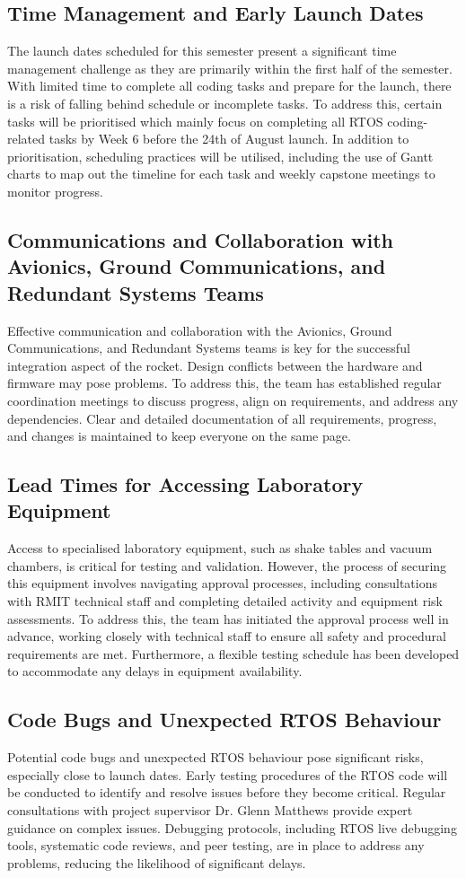 \subsection{Time Management and Early Launch Dates}
The launch dates scheduled for this semester present a significant time management challenge as they are primarily within the first half of the semester. With limited time to complete all coding tasks and prepare for the launch, there is a risk of falling behind schedule or incomplete tasks. To address this, certain tasks will be prioritised which mainly focus on completing all RTOS coding-related tasks by Week 6 before the 24th of August launch. In addition to prioritisation, scheduling practices will be utilised, including the use of Gantt charts to map out the timeline for each task and weekly capstone meetings to monitor progress. 

\subsection{Communications and Collaboration with Avionics, Ground Communications, and Redundant Systems Teams}
Effective communication and collaboration with the Avionics, Ground Communications, and Redundant Systems teams is key for the successful integration aspect of the rocket. Design conflicts between the hardware and firmware may pose problems. To address this, the team has established regular coordination meetings to discuss progress, align on requirements, and address any dependencies. Clear and detailed documentation of all requirements, progress, and changes is maintained to keep everyone on the same page. 

\subsection{Lead Times for Accessing Laboratory Equipment}
Access to specialised laboratory equipment, such as shake tables and vacuum chambers, is critical for testing and validation. However, the process of securing this equipment involves navigating approval processes, including consultations with RMIT technical staff and completing detailed activity and equipment risk assessments. To address this, the team has initiated the approval process well in advance, working closely with technical staff to ensure all safety and procedural requirements are met. Furthermore, a flexible testing schedule has been developed to accommodate any delays in equipment availability. 

\subsection{Code Bugs and Unexpected RTOS Behaviour}
Potential code bugs and unexpected RTOS behaviour pose significant risks, especially close to launch dates. Early testing procedures of the RTOS code will be conducted to identify and resolve issues before they become critical. Regular consultations with project supervisor Dr. Glenn Matthews provide expert guidance on complex issues. Debugging protocols, including RTOS live debugging tools, systematic code reviews, and peer testing, are in place to address any problems, reducing the likelihood of significant delays.



